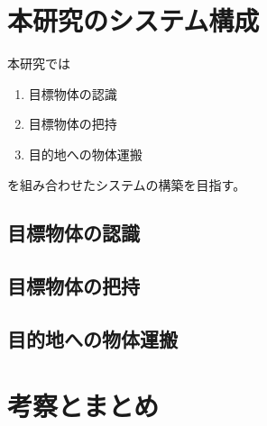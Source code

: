 \documentclass[twocolumn]{preport}
\begin{document}
\section{本研究のシステム構成}
本研究では
\begin{enumerate}
\item 目標物体の認識
\item 目標物体の把持
\item 目的地への物体運搬
\end{enumerate}
を組み合わせたシステムの構築を目指す。


\subsection{目標物体の認識}


\subsection{目標物体の把持}

\subsection{目的地への物体運搬}

\section{考察とまとめ}





\end{document}
